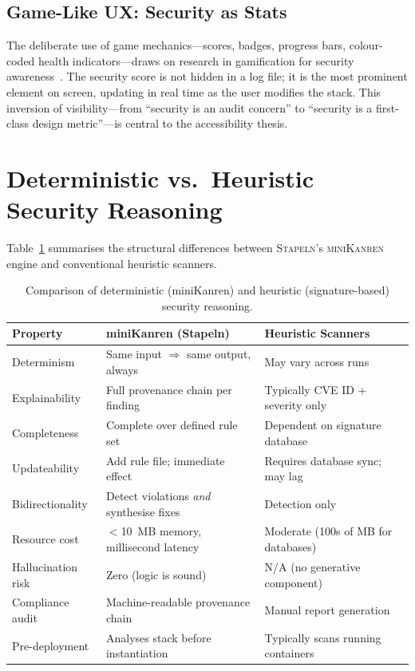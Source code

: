 \documentclass[11pt,twocolumn]{article}
\newcommand{\stapeln}{\textsc{Stapeln}\xspace}
\newcommand{\minikanren}{\textsc{miniKanren}\xspace}
\begin{document}
\subsection{Game-Like UX: Security as Stats}
\label{sec:visual-game}

The deliberate use of game mechanics---scores, badges, progress
bars, colour-coded health indicators---draws on research in
gamification for security awareness~\cite{deCaro2024,
scholefield2019}. The security score is not hidden in a log file;
it is the most prominent element on screen, updating in real time as
the user modifies the stack. This inversion of visibility---from
``security is an audit concern'' to ``security is a first-class
design metric''---is central to the accessibility thesis.


\section{Deterministic vs.\ Heuristic Security Reasoning}
\label{sec:comparison}

Table~\ref{tab:comparison} summarises the structural differences
between \stapeln's \minikanren engine and conventional heuristic
scanners.

\begin{table}[t]
\centering
\caption{Comparison of deterministic (miniKanren) and heuristic
(signature-based) security reasoning.}
\label{tab:comparison}
\small
\begin{tabular}{@{}lll@{}}
\toprule
\textbf{Property} & \textbf{miniKanren (Stapeln)} & \textbf{Heuristic Scanners} \\
\midrule
Determinism        & Same input $\Rightarrow$ same output, always & May vary across runs \\
Explainability     & Full provenance chain per finding & Typically CVE ID + severity only \\
Completeness       & Complete over defined rule set & Dependent on signature database \\
Updateability      & Add rule file; immediate effect & Requires database sync; may lag \\
Bidirectionality   & Detect violations \emph{and} synthesise fixes & Detection only \\
Resource cost      & $<$10~MB memory, millisecond latency & Moderate (100s of MB for databases) \\
Hallucination risk & Zero (logic is sound) & N/A (no generative component) \\
Compliance audit   & Machine-readable provenance chain & Manual report generation \\
Pre-deployment     & Analyses stack before instantiation & Typically scans running containers \\
\bottomrule
\end{tabular}
\end{table}
\end{document}
